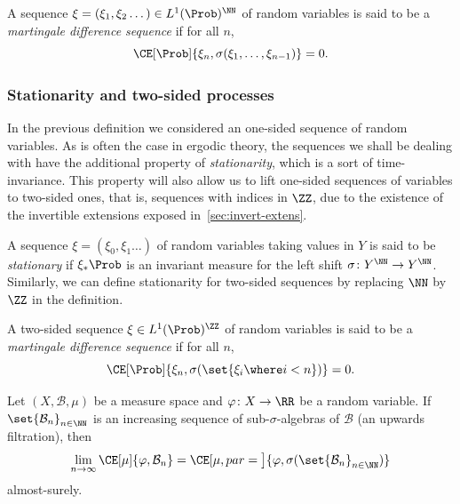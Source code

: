 \documentclass[../main]{subfiles}
\begin{document}
\begin{definition}
  A sequence \(\xi = (\xi_1,\xi_2\dots) \in L^1(\Prob)^{\NN}\) of random variables  is said to be a \emph{martingale difference sequence} if for all \(n\),
  \begin{equation*}
    \CE[\Prob]{\xi_{n}, {\sigma(\xi_1,\dots,\xi_{n - 1})}} = 0.
  \end{equation*}
\end{definition}

\subsubsection{Stationarity and two-sided processes}

In the previous definition we considered an one-sided sequence of random variables. As is often the case in ergodic theory, the sequences we shall be dealing with have the additional property of \emph{stationarity}, which is a sort of time-invariance. This property will also allow us to lift one-sided sequences of variables to two-sided ones, that is, sequences with indices in \(\ZZ\), due to the existence of the invertible extensions exposed in~\cref{sec:invert-extens}.

\begin{definition}
  A sequence \(\xi = (\xi_0,\xi_1\dots)\) of random variables taking values in \(Y\) is said to be \emph{stationary} if \(\xi_*\Prob\) is an invariant measure for the left shift \(\sigma \colon Y^{\NN} \to Y^{\NN}\). Similarly, we can define stationarity for two-sided sequences by replacing \(\NN\) by \(\ZZ\) in the definition.
\end{definition}

\begin{definition}
  A two-sided sequence \(\xi \in L^1(\Prob)^{\ZZ}\) of random variables  is said to be a \emph{martingale difference sequence} if for all \(n\),
  \begin{equation*}
    \CE[\Prob]{\xi_{n}, {\sigma(\set{\xi_i \where i < n})}} = 0.
  \end{equation*}
\end{definition}

\begin{lemma}\label{lem:levy-up}
  Let \((X,\mathcal{B},\mu)\) be a measure space and \(\varphi \colon X \to \RR\) be a random variable. If \(\set{\mathcal{B}_n}_{n \in \NN}\) is an increasing sequence of sub-\(\sigma\)-algebras of \(\mathcal{B}\) (an upwards filtration), then
  \begin{equation*}
    \lim_{n \to \infty} \CE[\mu]{\varphi, \mathcal{B}_n} = \CE[\mu,par = \big]{\varphi, \sigma(\set{\mathcal{B}_n}_{n \in \NN})}
  \end{equation*}
  almost-surely.
\end{lemma}
\end{document}
